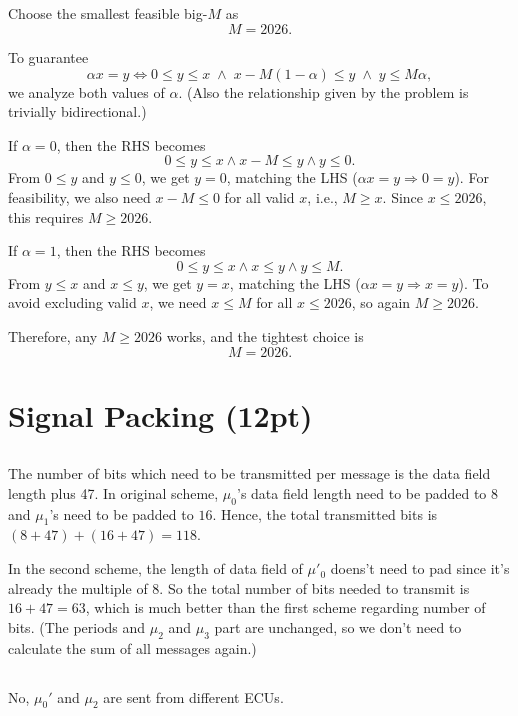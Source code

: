\documentclass{article}
\begin{document}
\subsection{}
Choose the smallest feasible big-$M$ as
\[
M=2026.
\]

To guarantee
\[
\alpha x = y \iff 0\le y\le x \;\wedge\; x-M(1-\alpha)\le y \;\wedge\; y\le M\alpha,
\]
we analyze both values of $\alpha$. (Also the relationship given by the problem is trivially bidirectional.)

If $\alpha=0$, then the RHS becomes
\[
0\le y\le x\land x-M\le y\land y\le 0.
\]
From $0\le y$ and $y\le 0$, we get $y=0$, matching the LHS ($\alpha x = y \Rightarrow 0=y$).
For feasibility, we also need $x-M\le 0$ for all valid $x$, i.e., $M\ge x$. Since $x\le 2026$, this requires $M\ge 2026$.

If $\alpha=1$, then the RHS becomes
\[
0\le y\le x\land x\le y\land y\le M.
\]
From $y\le x$ and $x\le y$, we get $y=x$, matching the LHS ($\alpha x = y \Rightarrow x=y$).
To avoid excluding valid $x$, we need $x\le M$ for all $x\le 2026$, so again $M\ge 2026$.

Therefore, any $M\ge 2026$ works, and the tightest choice is
\[
\boxed{M=2026}.
\]


\section{Signal Packing (12pt)}
\subsection{}
The number of bits which need to be transmitted per message is the data  field length plus 47. In original scheme, $\mu_0$'s data field length need to be padded to $8$ and $\mu_1$'s need to be padded to $16$. Hence, the total transmitted bits is $(8+47)+(16+47)=118$.

In the second scheme, the length of data field of $\mu'_0$ doens't need to pad since it's already the multiple of $8$. So the total number of bits needed to transmit is $16+47=63$, which is much better than the first scheme regarding number of bits. (The periods and $\mu_2$ and $\mu_3$ part are unchanged, so we don't need to calculate the sum of all messages again.)
\subsection{}
No, $\mu_0'$ and $\mu_2$ are sent from different ECUs.
\end{document}
